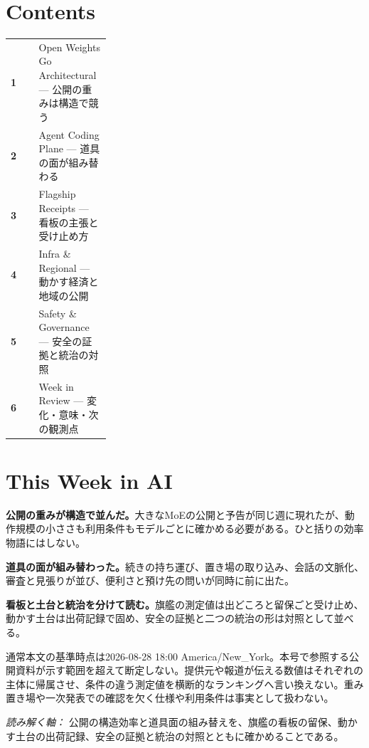 \section*{Contents}
\begin{tabularx}{0.98\linewidth}{@{}>{\bfseries}p{0.28\linewidth}X@{}}
  1 & Open Weights Go Architectural --- 公開の重みは構造で競う \\
  2 & Agent Coding Plane --- 道具の面が組み替わる \\
  3 & Flagship Receipts --- 看板の主張と受け止め方 \\
  4 & Infra \& Regional --- 動かす経済と地域の公開 \\
  5 & Safety \& Governance --- 安全の証拠と統治の対照 \\
  6 & Week in Review --- 変化・意味・次の観測点 \\
\end{tabularx}

\vspace{4mm}
\section*{This Week in AI}

\begin{tcolorbox}[enhanced,colback=SurveySoft,colframe=SurveyRule,boxrule=0.4pt,arc=1mm,left=3mm,right=3mm,top=2mm,bottom=2mm]
\textbf{公開の重みが構造で並んだ。}\quad 大きなMoEの公開と予告が同じ週に現れたが、動作規模の小ささも利用条件もモデルごとに確かめる必要がある。ひと括りの効率物語にはしない。
\end{tcolorbox}

\begin{tcolorbox}[enhanced,colback=SurveySoft,colframe=SurveyRule,boxrule=0.4pt,arc=1mm,left=3mm,right=3mm,top=2mm,bottom=2mm]
\textbf{道具の面が組み替わった。}\quad 続きの持ち運び、置き場の取り込み、会話の文脈化、審査と見張りが並び、便利さと預け先の問いが同時に前に出た。
\end{tcolorbox}

\begin{tcolorbox}[enhanced,colback=SurveySoft,colframe=SurveyRule,boxrule=0.4pt,arc=1mm,left=3mm,right=3mm,top=2mm,bottom=2mm]
\textbf{看板と土台と統治を分けて読む。}\quad 旗艦の測定値は出どころと留保ごと受け止め、動かす土台は出荷記録で固め、安全の証拠と二つの統治の形は対照として並べる。
\end{tcolorbox}

\vspace{2mm}
\begin{claimboundary}[この号の読み方]
通常本文の基準時点は2026-08-28 18:00 America/New\_York。本号で参照する公開資料が示す範囲を超えて断定しない。提供元や報道が伝える数値はそれぞれの主体に帰属させ、条件の違う測定値を横断的なランキングへ言い換えない。重み置き場や一次発表での確認を欠く仕様や利用条件は事実として扱わない。
\end{claimboundary}

\vspace{2mm}
\noindent\textit{読み解く軸：} 公開の構造効率と道具面の組み替えを、旗艦の看板の留保、動かす土台の出荷記録、安全の証拠と統治の対照とともに確かめることである。

